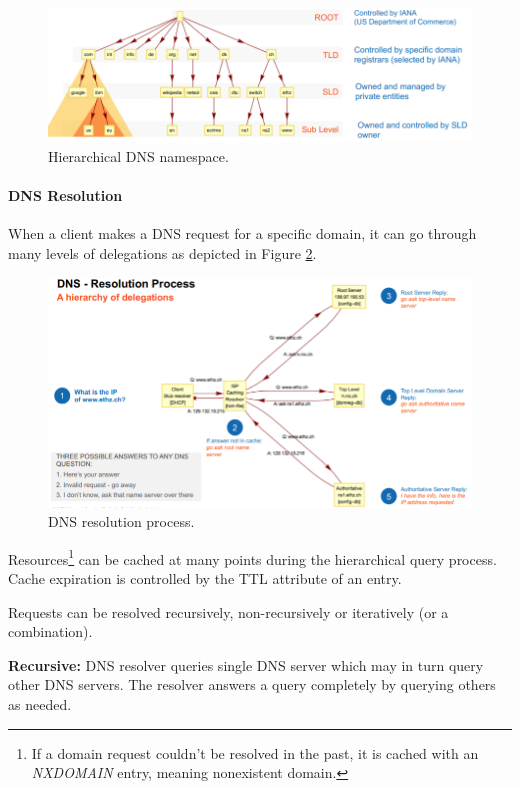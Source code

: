 \begin{figure}[h]
	\centering
	\includegraphics[scale=0.8]{images/915-namespace.PNG}
	\caption{Hierarchical DNS namespace.}
	\label{fig:namespace}
\end{figure}

\paragraph{DNS Resolution}
When a client makes a DNS request for a specific domain, it can go through many levels of delegations as depicted in Figure \ref{fig:resolution}.

\begin{figure}[h]
	\centering
	\includegraphics[scale=0.8]{images/915-resolution.PNG}
	\caption{DNS resolution process.}
	\label{fig:resolution}
\end{figure}

Resources\footnote{If a domain request couldn't be resolved in the past, it is cached with an \textit{NXDOMAIN} entry, meaning nonexistent domain.} can be cached at many points during the hierarchical query process. Cache expiration is controlled by the TTL attribute of an entry.

Requests can be resolved recursively, non-recursively or iteratively (or a combination).

\textbf{Recursive:} DNS resolver queries single DNS server which may in turn query other DNS servers. The resolver answers a query completely by querying others as needed.

